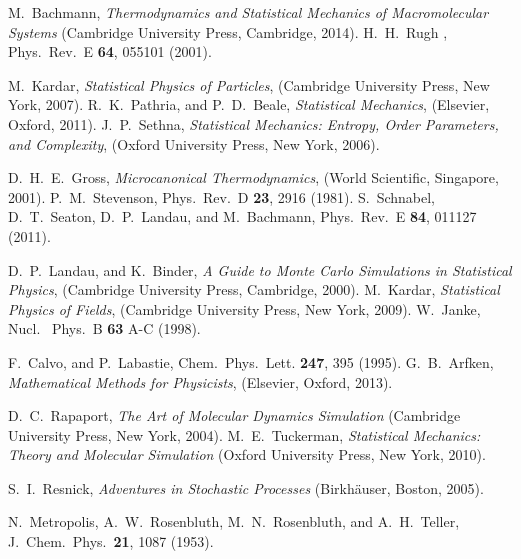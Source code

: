 M.~Bachmann, \emph{Thermodynamics and Statistical Mechanics of
Macromolecular Systems}  (Cambridge University Press, Cambridge,
2014).
%
H.~H.~Rugh , Phys.\ Rev.~E \textbf{64},
055101 (2001).


M.~Kardar, \emph{Statistical Physics of Particles}, (Cambridge University Press, New York, 2007).
%
R.~K.~Pathria, and P.~D.~Beale, \emph{Statistical Mechanics}, (Elsevier, Oxford, 2011).
%
J.~P.~Sethna, \emph{Statistical Mechanics: Entropy, Order Parameters, and Complexity}, 
(Oxford University Press, New York, 2006).
%


D.~H.~E.~Gross, \emph{Microcanonical Thermodynamics}, (World Scientific, Singapore,  2001).
%
P.~M.~Stevenson, Phys.\ Rev.~D \textbf{23}, 2916 (1981).
%
S.~Schnabel, D.~T.\ Seaton, D.~P.\ Landau, and M.~Bachmann, Phys.\ Rev.~E
\textbf{84}, 011127 (2011). 
%



D.~P.\ Landau, and K.~Binder, \emph{A Guide to Monte Carlo Simulations in Statistical Physics}, (Cambridge University Press, Cambridge, 2000).
%
M.~Kardar, \emph{Statistical Physics of Fields}, (Cambridge University Press, New York, 2009).
%
W.~Janke, Nucl. \ Phys.~B \textbf{63} A-C (1998).

F.~Calvo, and P.~Labastie,  Chem.\ Phys.\ Lett. \textbf{247}, 395 (1995).
%
G.~B.~Arfken, \emph{Mathematical Methods for Physicists},  (Elsevier, Oxford, 2013).

D.~C.~Rapaport,  \emph{The Art of Molecular Dynamics Simulation}  (Cambridge University Press, New York,
2004).
M.~E.~Tuckerman, \emph{Statistical Mechanics: Theory and Molecular Simulation} (Oxford University Press, New York, 2010).

S.~I.~Resnick, \emph{Adventures in Stochastic Processes} (Birkh{\"a}user, Boston, 2005).

N.~Metropolis, A.~W.~Rosenbluth, M.~N.~Rosenbluth, and A.~H.~Teller,   J.~Chem.\ Phys.\
\textbf{21}, 1087 (1953).

